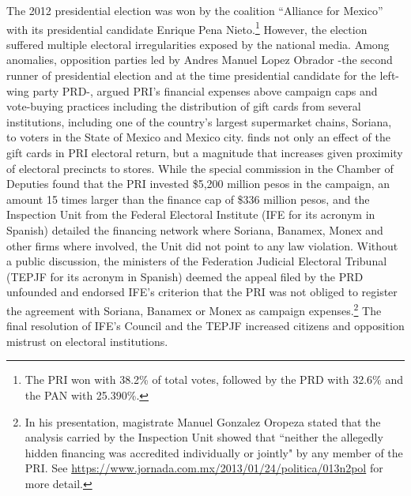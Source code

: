 \begin{appendix}
  The 2012 presidential election was won by the coalition ``Alliance for Mexico'' with its presidential candidate Enrique Pena Nieto.\footnote{The PRI won with 38.2\% of total votes, followed by the PRD with 32.6\% and the PAN with 25.390\%.} However, the election suffered multiple electoral irregularities exposed by the national media. Among anomalies, opposition parties led by Andres Manuel Lopez Obrador -the second runner of presidential election and at the time presidential candidate for the left-wing party PRD-, argued PRI's financial expenses above campaign caps and vote-buying practices including the distribution of gift cards from several institutions, including one of the country's largest supermarket chains, Soriana, to voters in the State of Mexico and Mexico city. \citet{cantu_2019} finds not only an effect of the gift cards in PRI electoral return, but a magnitude that increases given proximity of electoral precincts to stores. While the special commission in the Chamber of Deputies found that the PRI invested \$5,200 million pesos in the campaign, an amount 15 times larger than the finance cap of \$336 million pesos, and the Inspection Unit from the Federal Electoral Institute (IFE for its acronym in Spanish) detailed the financing network where Soriana, Banamex, Monex and other firms where involved, the Unit did not point to any law violation. Without a public discussion, the ministers of the Federation Judicial Electoral Tribunal (TEPJF for its acronym in Spanish) deemed the appeal filed by the PRD unfounded and endorsed IFE's  criterion that the PRI was not obliged to register the agreement with Soriana, Banamex or Monex as campaign expenses.\footnote{In his presentation, magistrate Manuel Gonzalez Oropeza stated that the analysis carried by the Inspection Unit showed that ``neither the allegedly hidden financing was accredited individually or jointly" by any member of the PRI. See \url{https://www.jornada.com.mx/2013/01/24/politica/013n2pol} for more detail.} The final resolution of IFE's Council and the TEPJF increased citizens and opposition mistrust on electoral institutions. 


\end{appendix}
